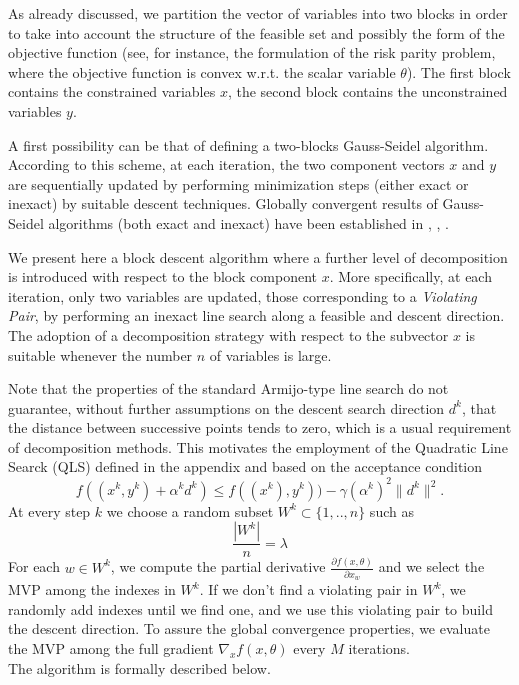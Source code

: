 As already discussed, we partition the vector of variables into two blocks in order to take into account
the structure of the feasible set and possibly the form of the objective function (see, for instance,
the formulation of the risk parity problem, where the objective function is convex w.r.t. the scalar variable $\theta$).
The first block contains the constrained variables $x$, the second block contains
the unconstrained variables $y$. 

A first possibility can be that of defining a two-blocks Gauss-Seidel algorithm.
According to this scheme, at each iteration, the two component vectors $x$ and $y$ are
sequentially updated by performing  minimization steps (either exact or inexact) by  suitable descent techniques.
Globally convergent results of Gauss-Seidel algorithms (both exact and inexact) have been established in \cite{}, \cite{}, \cite{}.

We present here a block descent algorithm where a further level of decomposition is
introduced with respect to the block component $x$. 
More specifically, at each iteration, only two variables are updated, those corresponding
to a {\it Violating Pair}, by performing an inexact line search along a feasible and descent direction.
The adoption of a decomposition strategy with respect to the subvector $x$ is suitable
whenever the number $n$ of variables is large.

Note that the properties of the standard Armijo-type line search do not guarantee, without further assumptions
on the descent search direction $d^k$, that the distance between successive points tends to zero, which is a usual requirement of decomposition methods. This motivates the employment of the Quadratic Line Searck (QLS) defined in the appendix and based on the acceptance condition
$$
f((x^k,y^k)+\alpha^kd^k)\le f((x^k),y^k))-\gamma (\alpha^k)^2\|d^k\|^2.
$$
At every step $k$ we choose a random subset $W^k\subset \{1,..,n\}$ such as
$$
\frac{|W^k|}{n} = \lambda
$$
For each $w \in W^k$, we compute the partial derivative $\frac{\partial f(x,\theta)}{\partial x_w}$ and we select the MVP among the indexes in $W^k$. If we don't find a violating pair in $W^k$, we randomly add indexes until we find one, and we use this violating pair to build the descent direction. To assure the global convergence properties, we evaluate the MVP among the full gradient $\nabla_x f(x,\theta)$ every $M$ iterations. \\
The algorithm is formally described below.

